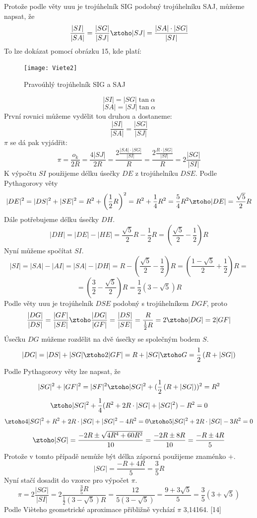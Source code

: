 \documentclass[rocnikovka]{gzwroc} %
\begin{document}
Protože podle věty uuu je trojúhelník SIG podobný trojúhelníku SAJ, můžeme napsat, že
$$
\frac{|SI|}{|SA|}=\frac{|SG|}{|SJ|} \ztoho |SJ|=\frac{|SA|\cdot |SG|}{|SI|}
$$
To lze dokázat pomocí obrázku 15, kde platí:
\begin{figure}[!ht]
\texttt{[image: Viete2]}
\caption{Pravoúhlý trojúhelník SIG a SAJ}
\label{fig:kruh}
\end{figure}
$$
|SI|=|SG| \tan \alpha
$$
$$
|SA|=|SJ| \tan \alpha
$$
První rovnici můžeme vydělit tou druhou a dostaneme:
$$
\frac{|SI|}{|SA|}=\frac{|SG|}{|SJ|}
$$
$\pi$ se dá pak vyjádřit:
$$
\pi=\frac{o_k}{2R}=\frac{4|SJ|}{2R}=\frac{2\frac{|SA|\cdot |SG|}{|SI|}}{R}=\frac{2\frac{R\cdot |SG|}{|SI|}}{R}=2\frac{|SG|}{|SI|}
$$
K výpočtu $SI$ použijeme délku úsečky $DE$ z trojúhelníku $DSE$. Podle Pythagorovy věty
$$
|DE|^2=|DS|^2+|SE|^2=R^2+\left(\frac{1}{2}R \right)^2=R^2+\frac{1}{4}R^2=\frac{5}{4}R^2 \ztoho |DE|=\frac{\sqrt{5}}{2}R
$$
Dále potřebujeme délku úsečky $DH$.
$$
|DH|=|DE|-|HE|=\frac{\sqrt{5}}{2}R-\frac{1}{2}R=\left(\frac{\sqrt{5}}{2}-\frac{1}{2}\right)R
$$
Nyní můžeme spočítat $SI$.
$$
|SI|=|SA|-|AI|=|SA|-|DH|=R-\left(\frac{\sqrt{5}}{2}-\frac{1}{2}\right)R=\left(\frac{1-\sqrt{5}}{2}+\frac{1}{2}\right)R=
$$
$$
=\left(\frac{3}{2}-\frac{\sqrt{5}}{2}\right)R=\frac{1}{2}\left(3-\sqrt{5}\right)R
$$
Podle věty uuu je trojúhelník $DSE$ podobný s trojúhelníkem $DGF$, proto
$$
\frac{|DG|}{|DS|}=\frac{|GF|}{|SE|} \ztoho \frac{|DG|}{|GF|}=\frac{|DS|}{|SE|}=\frac{R}{\frac{1}{2}R}=2 \ztoho |DG|=2|GF|
$$
Úsečku $DG$ můžeme rozdělit na dvě úsečky se společným bodem $S$.
$$
|DG|=|DS|+|SG| \ztoho 2|GF|=R+|SG| \ztoho G=\frac{1}{2} \left(R+|SG|\right)
$$
Podle Pythagorovy věty lze napsat, že
$$
|SG|^2+|GF|^2=|SF|^2 \ztoho |SG|^2+(\frac{1}{2}\left(R+|SG|\right))^2=R^2
$$
$$
\ztoho |SG|^2+\frac{1}{4}(R^2+2R\cdot |SG| +|SG|^2)-R^2=0 
$$
$$
\ztoho 4|SG|^2 +R^2+2R\cdot |SG|+|SG|^2-4R^2=0 \ztoho 5|SG|^2+2R\cdot |SG|-3R^2=0 
$$
$$
\ztoho |SG|=\frac{-2R\pm \sqrt{4R^4+60R^2}}{10}=\frac{-2R\pm 8R}{10}=\frac{-R\pm 4R}{5}
$$
Protože v tomto případě nemůže být délka záporná použijeme znaménko $+$.
$$
|SG|=\frac{-R+4R}{5}=\frac{3}{5}R
$$
Nyní stačí dosadit do vzorce pro výpočet $\pi$.
$$
\pi=2\frac{|SG|}{|SI|}=2\frac{\frac{3}{5}R}{\frac{1}{2}\left(3-\sqrt{5}\right)R}=\frac{12}{5\left(3-\sqrt{5}\right)}=\frac{9+3\sqrt{5}}{5}=\frac{3}{5}(3+\sqrt{5})
$$
Podle Vièteho geometrické aproximace přibližně vychází $\pi$ 3,14164. [14]
\end{document}

